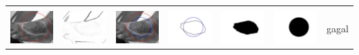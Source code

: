 \begin{table}[H]
\begin{tabular}{|m{0.7in}|m{0.7in}|m{0.7in}|m{0.7in}|m{0.7in}|m{0.7in}|m{0.7in}|}
		&  &  & & & &  \\
		\includegraphics[width=0.7in]{dataset/dataset_3/luka_merah/ready/11_integer_init.jpg}&
		\includegraphics[width=0.7in]{dataset/dataset_3/luka_merah/ready/11_integer_ext.jpg}&
		\includegraphics[width=0.7in]{dataset/dataset_3/luka_merah/ready/11_integer_result.jpg}&
		\includegraphics[width=0.7in]{dataset/dataset_3/luka_merah/ready/11_gt_r_integer.jpg}&
		\includegraphics[width=0.7in]{dataset/dataset_3/luka_merah/ready/11_r.jpg}&
		\includegraphics[width=0.7in]{dataset/dataset_3/luka_merah/ready/11_integer_r.jpg}&
		gagal\\
		\hline
		

\end{tabular}
\end{table}

